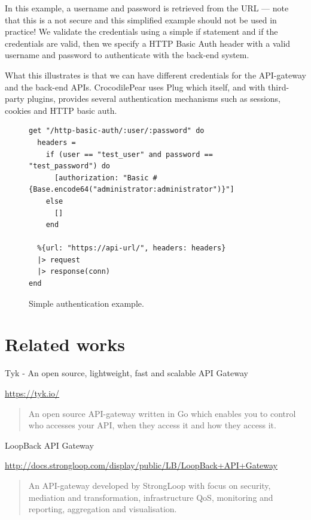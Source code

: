 \documentclass{cslthse-msc}
\begin{document}
In this example, a username and password is retrieved from the URL --- note that this is a not secure and this simplified example should not be used in practice! We validate the credentials using a simple if statement and if the credentials are valid, then we specify a HTTP Basic Auth header with a valid username and password to authenticate with the back-end system.

What this illustrates is that we can have different credentials for the API-gateway and the back-end APIs. CrocodilePear uses Plug which itself, and with third-party plugins, provides several authentication mechanisms such as sessions, cookies and HTTP basic auth.

\begin{figure}[H]
  \centering
\begin{lstlisting}[breaklines=true,frame=single]
get "/http-basic-auth/:user/:password" do
  headers =
    if (user == "test_user" and password == "test_password") do
      [authorization: "Basic #{Base.encode64("administrator:administrator")}"]
    else
      []
    end
  
  %{url: "https://api-url/", headers: headers}
  |> request
  |> response(conn)
end
\end{lstlisting}
  \caption{Simple authentication example.}
\end{figure}

\section{Related works}
Tyk - An open source, lightweight, fast and scalable API Gateway

\noindent \url{https://tyk.io/}

\begin{quote}
	An open source API-gateway written in Go which enables you to control who accesses your API, when they access it and how they access it.
\end{quote}

\vspace{5mm}
\noindent LoopBack API Gateway

\noindent \url{http://docs.strongloop.com/display/public/LB/LoopBack+API+Gateway}

\begin{quote}
	An API-gateway developed by StrongLoop with focus on security, mediation and transformation, infrastructure QoS, monitoring and reporting, aggregation and visualisation. 
\end{quote}
\end{document}
